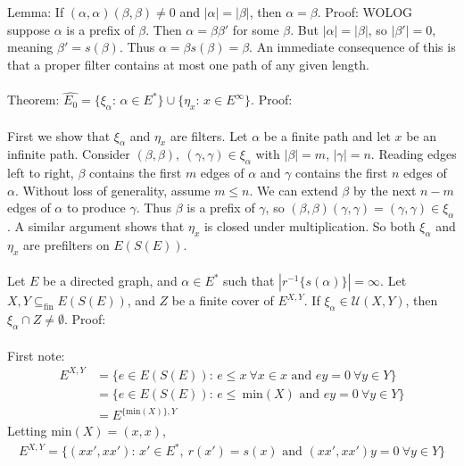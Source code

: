 \documentclass{article}
\begin{document}
Lemma: If $(\alpha, \alpha)(\beta, \beta) \neq 0$ and $|\alpha| = |\beta|$, then $\alpha = \beta$. Proof:
WOLOG suppose $\alpha$ is a prefix of $\beta$. Then $\alpha = \beta \beta'$ for some $\beta$. But
$|\alpha| = |\beta|$, so $|\beta'| = 0$, meaning $\beta' = s(\beta)$. Thus $\alpha = \beta s(\beta) = \beta$.
An immediate consequence of this is that a proper filter contains at most one path of any given length.
\\ \\
Theorem: $\hat{E_0} = \{\xi_\alpha\text{: } \alpha \in E^*\} \cup \{\eta_x\text{: } x \in E^\infty\}$. Proof:
\\ \\
First we show that $\xi_\alpha$ and $\eta_x$ are filters. Let $\alpha$ be a finite path and let $x$ be an infinite path.
Consider $(\beta, \beta), \ (\gamma, \gamma) \in \xi_\alpha$ with $|\beta| = m$, $|\gamma| = n$. 
Reading edges left to right, $\beta$ contains the first $m$ edges of $\alpha$ and $\gamma$ 
contains the first $n$ edges of $\alpha$. Without loss of generality, assume $m \leq n$. 
We can extend $\beta$ by the next $n - m$ edges of $\alpha$ to produce $\gamma$. Thus
$\beta$ is a prefix of $\gamma$, so $(\beta, \beta)(\gamma, \gamma) = (\gamma, \gamma) \in \xi_\alpha$.
A similar argument shows that $\eta_x$ is closed under multiplication. So both $\xi_\alpha$ and $\eta_x$ are prefilters
on $E(S(E))$.
\\ \\
Let $E$ be a directed graph, and $\alpha \in E^*$ such that $|r^{-1}\{s(\alpha)\}| = \infty$.
Let $X, Y \subseteq_{\text{fin}} E(S(E))$, and $Z$ be a finite cover of $E^{X, Y}$.
If $\xi_\alpha \in \mathcal{U}(X, Y)$, then $\xi_\alpha \cap Z \neq \emptyset$. Proof:
\\ \\
First note:
\begin{align*}
    E^{X, Y} &= \{ e \in E(S(E))\text{: } e \leq x \ \forall x \in x \text{ and } ey = 0 \ \forall y \in Y \} \\
             &= \{ e \in E(S(E))\text{: } e \leq \ \text{min}(X) \text{ and } ey = 0 \ \forall y \in Y \} \\
             &= E^{\{\text{min}(X)\}, Y}
\end{align*}
Letting min$(X) = (x, x)$,
\begin{align*}
    E^{X, Y} = \{ (xx', xx') \text{: } x' \in E^*, \ r(x') = s(x) \text{ and } (xx', xx')y = 0 \ \forall y \in Y \}
\end{align*}
\end{document}
